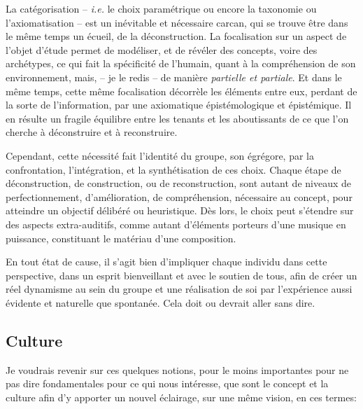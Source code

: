La catégorisation -- \textit{i.e.} le choix paramétrique ou encore la taxonomie ou l'axiomatisation -- est un inévitable et nécessaire carcan, qui se trouve être dans le même temps un écueil, de la déconstruction. La focalisation sur un aspect de l'objet d'étude permet de modéliser, et de révéler des concepts, voire des archétypes, ce qui fait la spécificité de l'humain, quant à la compréhension de son environnement, mais, -- je le redis -- de manière \textit{partielle et partiale}. Et dans le même temps, cette même focalisation décorrèle les éléments entre eux, perdant de la sorte de l'information, par  une axiomatique épistémologique et épistémique. Il en résulte un fragile équilibre entre les tenants et les aboutissants de ce que l'on cherche à déconstruire et à reconstruire. 

Cependant, cette nécessité fait l'identité du groupe, son égrégore, par la confrontation, l'intégration, et la synthétisation de ces choix.  Chaque étape de déconstruction, de construction, ou de reconstruction, sont autant de niveaux de %
perfectionnement, d'amélioration, de compréhension, nécessaire au concept, pour atteindre un objectif délibéré ou heuristique. 
Dès lors, le choix peut s'étendre sur des aspects extra-auditifs, comme autant d'éléments porteurs d'une musique en puissance, constituant le matériau d'une composition.

\bigskip 

En tout état de cause, il s'agit bien d'impliquer chaque individu dans cette perspective, dans un esprit bienveillant et avec le soutien de tous, afin de créer un réel dynamisme au sein du groupe et
une réalisation de soi par l’expérience aussi évidente et naturelle que spontanée. Cela doit ou devrait aller sans dire.

\subsection*{Culture} 
\label{culture}

Je voudrais revenir sur ces quelques notions, pour le moins importantes pour ne pas dire fondamentales pour ce qui nous intéresse, que sont le concept et la culture afin d'y apporter un nouvel éclairage, sur une même vision, en ces termes:

